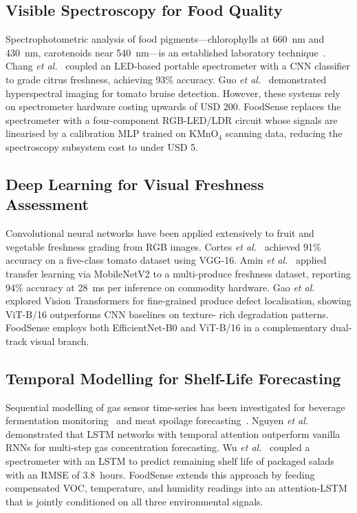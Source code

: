 \documentclass[conference]{IEEEtran}
\begin{document}
\subsection{Visible Spectroscopy for Food Quality}
Spectrophotometric analysis of food pigments---chlorophylls at 660~nm
and 430~nm, carotenoids near 540~nm---is an established laboratory
technique~\cite{Fodor2024}. Chang \textit{et al.}~\cite{Chang2023}
coupled an LED-based portable spectrometer with a CNN classifier to
grade citrus freshness, achieving 93\% accuracy. Guo \textit{et al.}~\cite{Guo2020}
demonstrated hyperspectral imaging for tomato bruise detection.
However, these systems rely on spectrometer hardware costing upwards
of USD 200. FoodSense replaces the spectrometer with a four-component
RGB-LED/LDR circuit whose signals are linearised by a calibration MLP
trained on KMnO$_4$ scanning data, reducing the spectroscopy subsystem
cost to under USD 5.

\subsection{Deep Learning for Visual Freshness Assessment}
Convolutional neural networks have been applied extensively to fruit
and vegetable freshness grading from RGB images. Cortes \textit{et al.}~\cite{Cortes2019}
achieved 91\% accuracy on a five-class tomato dataset using VGG-16.
Amin \textit{et al.}~\cite{Amin2023} applied transfer learning via
MobileNetV2 to a multi-produce freshness dataset, reporting 94\%
accuracy at 28~ms per inference on commodity hardware. Gao \textit{et al.}~\cite{Gao2024}
explored Vision Transformers for fine-grained produce defect
localisation, showing ViT-B/16 outperforms CNN baselines on texture-
rich degradation patterns. FoodSense employs both EfficientNet-B0 and
ViT-B/16 in a complementary dual-track visual branch.

\subsection{Temporal Modelling for Shelf-Life Forecasting}
Sequential modelling of gas sensor time-series has been investigated
for beverage fermentation monitoring~\cite{Ren2023} and meat spoilage
forecasting~\cite{Saha2023}. Nguyen \textit{et al.}~\cite{Nguyen2024}
demonstrated that LSTM networks with temporal attention outperform
vanilla RNNs for multi-step gas concentration forecasting. Wu \textit{et al.}~\cite{Wu2023}
coupled a spectrometer with an LSTM to predict remaining shelf life of
packaged salads with an RMSE of 3.8~hours. FoodSense extends this
approach by feeding compensated VOC, temperature, and humidity
readings into an attention-LSTM that is jointly conditioned on all
three environmental signals.
\end{document}
